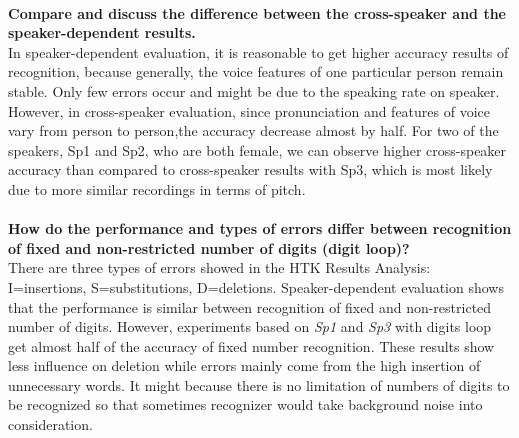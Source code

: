 \documentclass[onecolumn]{article}
\begin{document}
\\
\noindent \textbf{Compare and discuss the difference between the cross-speaker and the speaker-dependent results.}\\
In speaker-dependent evaluation, it is reasonable to get higher accuracy results of recognition, because generally, the voice features of one particular person remain stable. Only few errors occur and might be due to the speaking rate on speaker. However, in cross-speaker evaluation, since pronunciation and features of voice vary from person to person,the accuracy decrease almost by half. For two of the speakers, Sp1 and Sp2, who are both female, we can observe higher cross-speaker accuracy than compared to cross-speaker results with Sp3, which is most likely due to more similar recordings in terms of pitch.\\
\\
\noindent \textbf{How do the performance and types of errors differ between recognition of fixed and non-restricted number of digits (digit loop)?}\\
There are three types of errors showed in the HTK Results Analysis: I=insertions, S=substitutions, D=deletions. Speaker-dependent evaluation shows that the performance is similar between recognition of fixed and non-restricted number of digits. However, experiments based on \emph{Sp1} and \emph{Sp3} with digits loop get almost half of the accuracy of fixed number recognition. These results show less influence on deletion while errors mainly come from the high insertion of unnecessary words. It might because there is no limitation of numbers of digits to be recognized so that sometimes recognizer would take background noise into consideration. 
\end{document}
